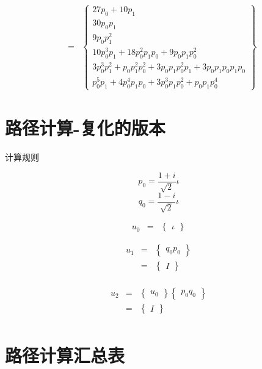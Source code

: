 \documentclass[a4paper,12pt]{article}
\numberwithin{definition}{section}
\numberwithin{lemma}{section}
\numberwithin{proposition}{section}
\numberwithin{theorem}{section}
\numberwithin{grammar}{section}
\numberwithin{program}{section}
\numberwithin{convention}{section}
\numberwithin{corollary}{section}
\numberwithin{principle}{section}
\begin{document}
$$\begin{array}{lcl}
    & = & \begin{Bmatrix} 27 p_0 + 10 p_1 \\ 30 p_0 p_1 \\ 9 p_0 p_1^2 \\ 10 p_0^3 p_1 + 18 p_0^2 p_1 p_0 + 9 p_0 p_1 p_0^2 \\ 3 p_0^3 p_1^2 + p_0 p_1^2 p_0^2 + 3 p_0 p_1 p_0^2 p_1 + 3 p_0 p_1 p_0 p_1 p_0 \\ p_0^5 p_1 + 4 p_0^4 p_1 p_0 + 3 p_0^3 p_1 p_0^2 + p_0 p_1 p_0^4 \end{Bmatrix}
\end{array}$$


\newpage

\section{路径计算-复化的版本}

计算规则

$$p_0 = \frac{1 + i}{\sqrt{2}} \iota$$
$$q_0 = \frac{1 - i}{\sqrt{2}} \iota$$

$$\begin{array}{lcl}
u_0 & = & \begin{Bmatrix} \iota \end{Bmatrix}
\end{array}$$

$$\begin{array}{lcl}
u_1 & = & \begin{Bmatrix} q_0 p_0 \end{Bmatrix} \\
    & = & \begin{Bmatrix} I \end{Bmatrix} \\
\end{array}$$

$$\begin{array}{lcl}
u_2 & = & \begin{Bmatrix} u_0 \end{Bmatrix} \begin{Bmatrix} p_0 q_0 \end{Bmatrix} \\
    & = & \begin{Bmatrix} I \end{Bmatrix} \\
\end{array}$$

\newpage

\section{路径计算汇总表}
\end{document}
